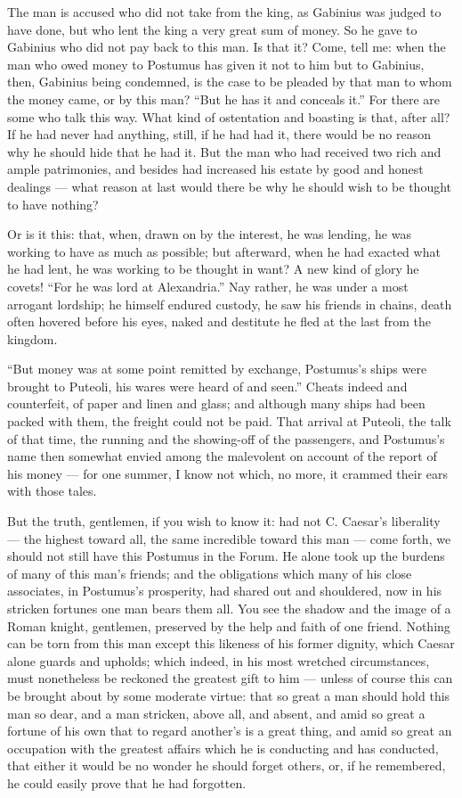  The man is accused who did not take from the king, as Gabinius was judged to have done, but who lent the king a very great sum of money. So he gave to Gabinius who did not pay back to this man. Is that it? Come, tell me: when the man who owed money to Postumus has given it not to him but to Gabinius, then, Gabinius being condemned, is the case to be pleaded by that man to whom the money came, or by this man? ``But he has it and conceals it.'' For there are some who talk this way. What kind of ostentation and boasting is that, after all? If he had never had anything, still, if he had had it, there would be no reason why he should hide that he had it. But the man who had received two rich and ample patrimonies, and besides had increased his estate by good and honest dealings --- what reason at last would there be why he should wish to be thought to have nothing?

 Or is it this: that, when, drawn on by the interest, he was lending, he was working to have as much as possible; but afterward, when he had exacted what he had lent, he was working to be thought in want? A new kind of glory he covets! ``For he was lord at Alexandria.'' Nay rather, he was under a most arrogant lordship; he himself endured custody, he saw his friends in chains, death often hovered before his eyes, naked and destitute he fled at the last from the kingdom.

 ``But money was at some point remitted by exchange, Postumus's ships were brought to Puteoli, his wares were heard of and seen.'' Cheats indeed and counterfeit, of paper and linen and glass; and although many ships had been packed with them, the freight could not be paid. That arrival at Puteoli, the talk of that time, the running and the showing-off of the passengers, and Postumus's name then somewhat envied among the malevolent on account of the report of his money --- for one summer, I know not which, no more, it crammed their ears with those tales.

 But the truth, gentlemen, if you wish to know it: had not C. Caesar's liberality --- the highest toward all, the same incredible toward this man --- come forth, we should not still have this Postumus in the Forum. He alone took up the burdens of many of this man's friends; and the obligations which many of his close associates, in Postumus's prosperity, had shared out and shouldered, now in his stricken fortunes one man bears them all. You see the shadow and the image of a Roman knight, gentlemen, preserved by the help and faith of one friend. Nothing can be torn from this man except this likeness of his former dignity, which Caesar alone guards and upholds; which indeed, in his most wretched circumstances, must nonetheless be reckoned the greatest gift to him --- unless of course this can be brought about by some moderate virtue: that so great a man should hold this man so dear, and a man stricken, above all, and absent, and amid so great a fortune of his own that to regard another's is a great thing, and amid so great an occupation with the greatest affairs which he is conducting and has conducted, that either it would be no wonder he should forget others, or, if he remembered, he could easily prove that he had forgotten.

